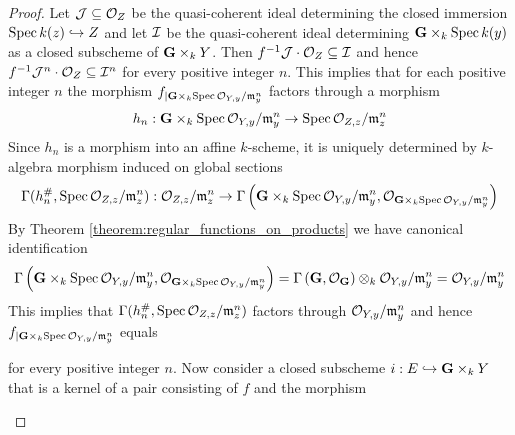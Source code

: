 \begin{proof}
Let ${\mathcal J} \subseteq {\mathcal O}_Z$ be the quasi-coherent ideal determining the closed immersion $\mathrm{Spec}\, k(z)\hookrightarrow Z$ and let ${\mathcal I}$ be the quasi-coherent ideal determining $\mathbf{G}\times_k\mathrm{Spec}\, k(y)$ as a closed subscheme of $\mathbf{G}\times_kY$. Then $f^{-1}{\mathcal J}\cdot{\mathcal O}_Z\subseteq {\mathcal I}$ and hence $f^{-1}{\mathcal J}^n\cdot{\mathcal O}_Z\subseteq {\mathcal I}^n$ for every positive integer $n$. This implies that for each positive integer $n$ the morphism $f_{\mid \mathbf{G}\times_k\mathrm{Spec}\, {\mathcal O}_{Y,y}/\mathfrak{m}_y^n}$ factors through a morphism
$$h_n:\mathbf{G}\times_k\mathrm{Spec}\, {\mathcal O}_{Y,y}/\mathfrak{m}_y^n \rightarrow \mathrm{Spec}\, {\mathcal O}_{Z,z}/\mathfrak{m}_z^n$$
Since $h_n$ is a morphism into an affine $k$-scheme, it is uniquely determined by $k$-algebra morphism induced on global sections
$$\Gamma(h^{\#}_n,\mathrm{Spec}\, {\mathcal O}_{Z,z}/\mathfrak{m}_z^n):{\mathcal O}_{Z,z}/\mathfrak{m}_z^n\rightarrow \Gamma\left(\mathbf{G}\times_k\mathrm{Spec}\, {\mathcal O}_{Y,y}/\mathfrak{m}^n_y,{\mathcal O}_{\mathbf{G}\times_k\mathrm{Spec}\, {\mathcal O}_{Y,y}/\mathfrak{m}^n_y}\right)$$
By Theorem \ref{theorem:regular_functions_on_products} we have canonical identification
$$\Gamma\left(\mathbf{G}\times_k\mathrm{Spec}\, {\mathcal O}_{Y,y}/\mathfrak{m}^n_y,{\mathcal O}_{\mathbf{G}\times_k\mathrm{Spec}\, {\mathcal O}_{Y,y}/\mathfrak{m}^n_y}\right) = \Gamma\left(\mathbf{G},{\mathcal O}_{\mathbf{G}}\right)\otimes_k{\mathcal O}_{Y,y}/\mathfrak{m}_y^n = {\mathcal O}_{Y,y}/\mathfrak{m}^n_y$$
This implies that $\Gamma(h^{\#}_n,\mathrm{Spec}\, {\mathcal O}_{Z,z}/\mathfrak{m}_z^n)$ factors through ${\mathcal O}_{Y,y}/\mathfrak{m}^n_y$ and hence $f_{\mid \mathbf{G}\times_k\mathrm{Spec}\, {\mathcal O}_{Y,y}/\mathfrak{m}^n_y}$ equals
\begin{center}
\end{center}
for every positive integer $n$. Now consider a closed subscheme $i:E\hookrightarrow \mathbf{G}\times_kY$ that is a kernel of a pair consisting of $f$ and the morphism
\begin{center}
\end{center}
\end{proof}
